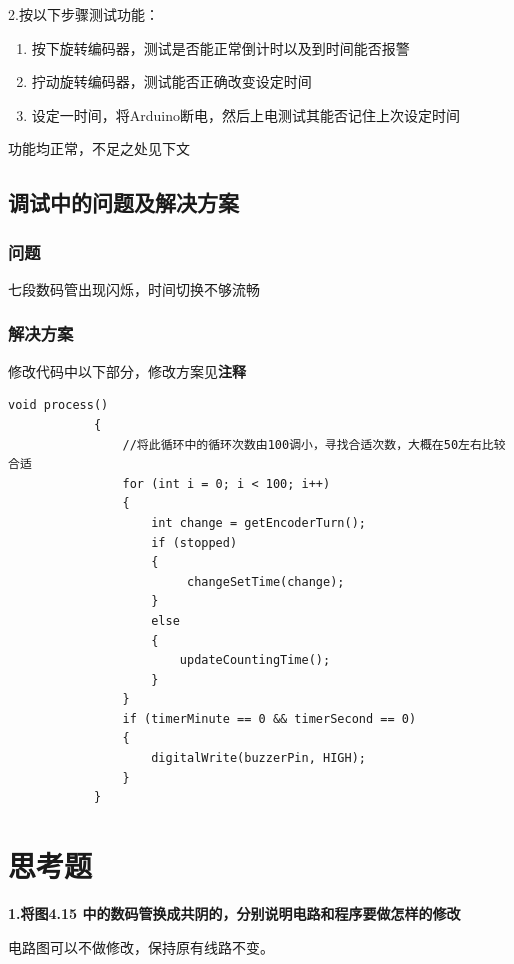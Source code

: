 \documentclass{../source/zjureport}
\begin{document}
        2.按以下步骤测试功能：
        \begin{enumerate}
            \item 按下旋转编码器，测试是否能正常倒计时以及到时间能否报警
            \item 拧动旋转编码器，测试能否正确改变设定时间
            \item 设定一时间，将Arduino断电，然后上电测试其能否记住上次设定时间
        \end{enumerate}

        
        功能均正常，不足之处见下文

        \subsection{调试中的问题及解决方案}
            \subsubsection{问题}
            七段数码管出现闪烁，时间切换不够流畅

            \subsubsection{解决方案}
            修改代码中以下部分，修改方案见\textbf{注释}
            \begin{lstlisting}[name=数码管闪烁解决方案]
        void process()
            {
                //将此循环中的循环次数由100调小，寻找合适次数，大概在50左右比较合适
                for (int i = 0; i < 100; i++) 
                {
                    int change = getEncoderTurn();
                    if (stopped)
                    {
                         changeSetTime(change);
                    }
                    else
                    {
                        updateCountingTime();
                    }
                }
                if (timerMinute == 0 && timerSecond == 0)
                {
                    digitalWrite(buzzerPin, HIGH);
                }
            }
            \end{lstlisting}


    \section{思考题}
        \textbf{1.将图4.15 中的数码管换成共阴的，分别说明电路和程序要做怎样的修改}
            
        
        电路图可以不做修改，保持原有线路不变。
\end{document}
